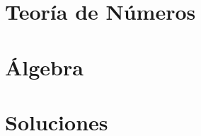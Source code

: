 \documentclass[letterpaper,11pt,oneside]{book}
\theoremstyle{definition}
\theoremstyle{remark}
\begin{document}
	\part{Teor\'ia de N\'umeros}
	
	
	\part{\'Algebra}\label{part:algebra}
	
	
	
	\part{Soluciones}
	
		
\end{document}

